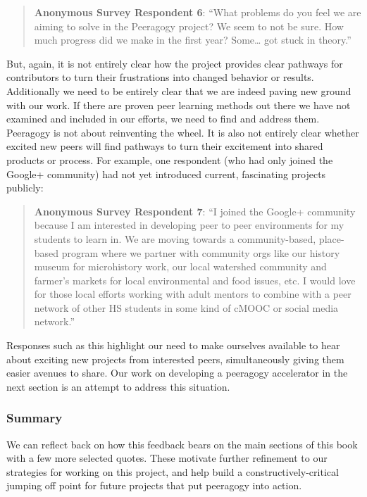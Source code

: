 \begin{quote}
\textbf{Anonymous Survey Respondent 6}: ``What problems do you feel we
are aiming to solve in the Peeragogy project? We seem to not be sure.
How much progress did we make in the first year? Some\ldots{} got stuck
in theory.''
\end{quote}
But, again, it is not entirely clear how the project provides clear
pathways for contributors to turn their frustrations into changed
behavior or results. Additionally we need to be entirely clear that we
are indeed paving new ground with our work. If there are proven peer
learning methods out there we have not examined and included in our
efforts, we need to find and address them. Peeragogy is not about
reinventing the wheel. It is also not entirely clear whether excited new
peers will find pathways to turn their excitement into shared products
or process. For example, one respondent (who had only joined the Google+
community) had not yet introduced current, fascinating projects
publicly:

\begin{quote}
\textbf{Anonymous Survey Respondent 7}: ``I joined the Google+ community
because I am interested in developing peer to peer environments for my
students to learn in. We are moving towards a community-based,
place-based program where we partner with community orgs like our
history museum for microhistory work, our local watershed community and
farmer's markets for local environmental and food issues, etc. I would
love for those local efforts working with adult mentors to combine with
a peer network of other HS students in some kind of cMOOC or social
media network.''
\end{quote}
Responses such as this highlight our need to make ourselves available to
hear about exciting new projects from interested peers, simultaneously
giving them easier avenues to share. Our work on developing a peeragogy
accelerator in the next section is an attempt to address this situation.

\subsubsection{Summary}

We can reflect back on how this feedback bears on the main sections of
this book with a few more selected quotes. These motivate further
refinement to our strategies for working on this project, and help build
a constructively-critical jumping off point for future projects that put
peeragogy into action.



